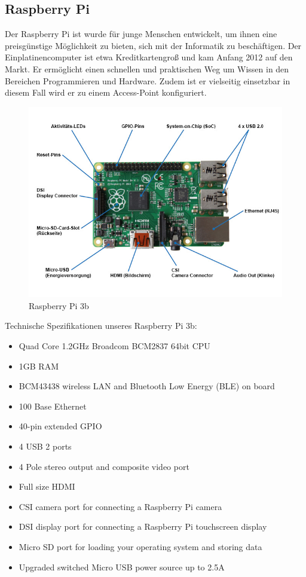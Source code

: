\documentclass[a4paper,11pt,singlespacing]{article}
\begin{document}
    		\subsection{Raspberry Pi}
    			Der Raspberry Pi ist wurde für junge Menschen entwickelt, um ihnen eine preisgünstige Möglichkeit zu bieten, sich mit der Informatik zu beschäftigen. Der Einplatinencomputer ist etwa Kreditkartengroß und kam Anfang 2012 auf den Markt. Er ermöglicht einen schnellen und praktischen Weg um Wissen in den Bereichen Programmieren und Hardware. Zudem ist er vielseitig einsetzbar in diesem Fall wird er zu einem Access-Point konfiguriert. 
    			\begin{figure}[ht]
    				\centering
	    			\includegraphics[scale=0.5]{raspberry_pi_3b}
	    				\caption{Raspberry Pi 3b}
	    				\label{raspberrypi3b}
			\end{figure}
			Technische Spezifikationen unseres Raspberry Pi 3b:
			\begin{itemize}
				\item Quad Core 1.2GHz Broadcom BCM2837 64bit CPU
				\item 1GB RAM
				\item BCM43438 wireless LAN and Bluetooth Low Energy (BLE) on board
				\item 100 Base Ethernet
				\item 40-pin extended GPIO
				\item 4 USB 2 ports
				\item 4 Pole stereo output and composite video port
				\item Full size HDMI
				\item CSI camera port for connecting a Raspberry Pi camera
				\item DSI display port for connecting a Raspberry Pi touchscreen display
				\item Micro SD port for loading your operating system and storing data
				\item Upgraded switched Micro USB power source up to 2.5A
			\end{itemize}
\end{document}
